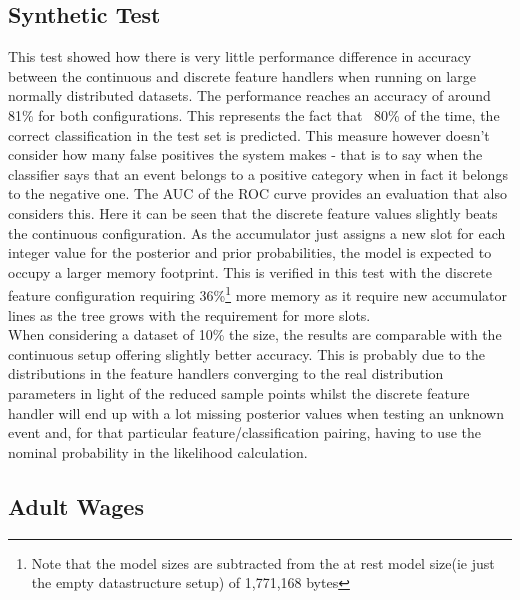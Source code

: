 \documentclass[a4paper,11pt]{scrreprt}
\begin{document}
\subsection{Synthetic Test}
This test showed how there is very little performance difference in accuracy between the continuous and discrete feature handlers when running on large normally distributed datasets. The performance reaches an accuracy of around 81\% for both configurations. This represents the fact that ~80\% of the time, the correct classification in the test set is predicted. This measure however doesn't consider how many false positives the system makes - that is to say when the classifier says that an event belongs to a positive category when in fact it belongs to the negative one. The AUC of the ROC curve provides an evaluation that also considers this. Here it can be seen that the discrete feature values slightly beats the continuous configuration. As the accumulator just assigns a new slot for each integer value for the posterior and prior probabilities, the model is expected to occupy a larger memory footprint. This is verified in this test with the discrete feature configuration requiring 36\%\footnote{Note that the model sizes are subtracted from the at rest model size(ie just the empty datastructure setup) of 1,771,168 bytes} more memory as it require new accumulator lines as the tree grows with the requirement for more slots.
\\
When considering a dataset of 10\% the size, the results are comparable with the continuous setup offering slightly better accuracy. This is probably due to the distributions in the feature handlers converging to the real distribution parameters in light of the reduced sample points whilst the discrete feature handler will end up with a lot missing posterior values when testing an unknown event and, for that particular feature/classification pairing, having to use the nominal probability in the likelihood calculation. 
\subsection{Adult Wages}
\end{document}
